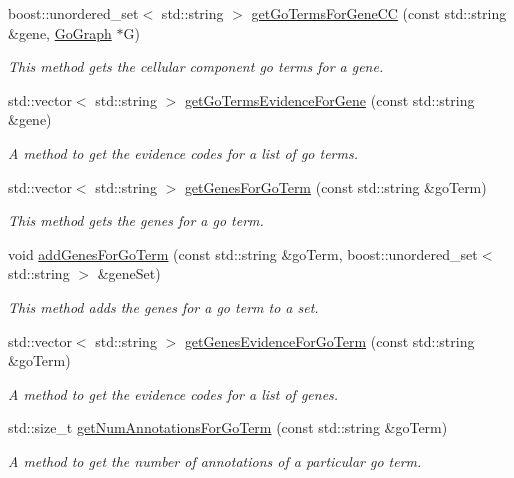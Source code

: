 \begin{DoxyCompactItemize}
boost\+::unordered\+\_\+set$<$ std\+::string $>$ \hyperlink{classAnnotationData_a37679ed0830c6d7ec41672b3df541663}{get\+Go\+Terms\+For\+Gene\+CC} (const std\+::string \&gene, \hyperlink{classGoGraph}{Go\+Graph} $\ast$G)
\begin{DoxyCompactList}\small\item\em This method gets the cellular component go terms for a gene. \end{DoxyCompactList}\item 
std\+::vector$<$ std\+::string $>$ \hyperlink{classAnnotationData_a4f61ca3276af902c72a031419e8155c5}{get\+Go\+Terms\+Evidence\+For\+Gene} (const std\+::string \&gene)
\begin{DoxyCompactList}\small\item\em A method to get the evidence codes for a list of go terms. \end{DoxyCompactList}\item 
std\+::vector$<$ std\+::string $>$ \hyperlink{classAnnotationData_a0028d38de841c5a508ad602907b42be7}{get\+Genes\+For\+Go\+Term} (const std\+::string \&go\+Term)
\begin{DoxyCompactList}\small\item\em This method gets the genes for a go term. \end{DoxyCompactList}\item 
void \hyperlink{classAnnotationData_adcae89b874856e2e30319382a51f3c14}{add\+Genes\+For\+Go\+Term} (const std\+::string \&go\+Term, boost\+::unordered\+\_\+set$<$ std\+::string $>$ \&gene\+Set)
\begin{DoxyCompactList}\small\item\em This method adds the genes for a go term to a set. \end{DoxyCompactList}\item 
std\+::vector$<$ std\+::string $>$ \hyperlink{classAnnotationData_a95cf54dc33c9f4e948e913424a44c52e}{get\+Genes\+Evidence\+For\+Go\+Term} (const std\+::string \&go\+Term)
\begin{DoxyCompactList}\small\item\em A method to get the evidence codes for a list of genes. \end{DoxyCompactList}\item 
std\+::size\+\_\+t \hyperlink{classAnnotationData_a985193a995893976a17f09217cced074}{get\+Num\+Annotations\+For\+Go\+Term} (const std\+::string \&go\+Term)
\begin{DoxyCompactList}\small\item\em A method to get the number of annotations of a particular go term. \end{DoxyCompactList}\item 

\end{DoxyCompactItemize}
